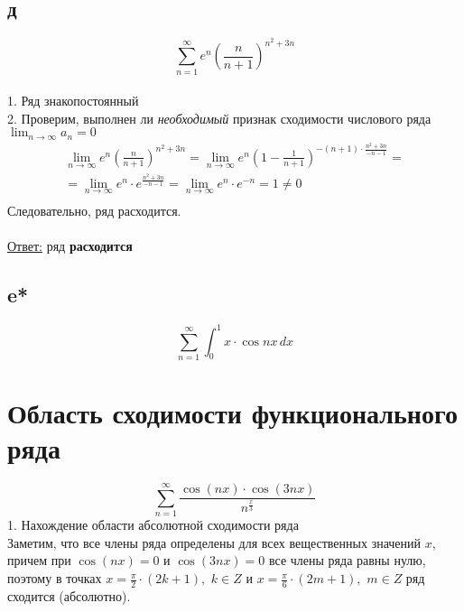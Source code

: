 \documentclass[a5paper, 10pt]{article}
\theoremstyle{definition}
\theoremstyle{plain}
\theoremstyle{remark}
\begin{document}
\subsection{д}
\begin{equation}
\sum \limits_{n = 1}^{\infty} e^n \left( \frac{n}{n+1} \right)^{n^2+3n}
\end{equation}
\\
1. Ряд знакопостоянный\\
2. Проверим, выполнен ли \textit{необходимый} признак сходимости числового ряда $ \lim_{n \to \infty} a_n = 0$
\begin{multline*}
\lim_{n \to \infty} e^n \left( \frac{n}{n+1} \right)^{n^2+3n} =
 \lim_{n \to \infty} e^n \left( 1-\frac{1}{n+1} \right)^{-(n+1) \cdot \frac{n^2+3n}{-n-1}} = \\ =
\lim_{n \to \infty} e^n\cdot e^{ \frac{n^2+3n}{-n-1}}  = \lim_{n \to \infty} e^n\cdot e^{-n} = 1 \neq 0 \\
\end{multline*}
Следовательно, ряд расходится.\\\\
\underline{Ответ:} ряд  \textbf{расходится}
\newpage
\subsection{e*}
\begin{equation}
\sum \limits_{n = 1}^{\infty}\int_0^1 x \cdot \cos nx \, dx
\end{equation}


\newpage
\section{Область сходимости функционального ряда}
\begin{equation}
\sum \limits_{n = 1}^{\infty}\frac{\cos( nx) \cdot \cos (3nx) }{n^{\frac{x}{3}}}
\end{equation}
1. Нахождение области абсолютной сходимости ряда\\

Заметим, что все члены ряда определены для всех вещественных значений $x$, причем при $\cos(nx) = 0$  и $\cos(3 nx) = 0$  все члены ряда равны нулю, поэтому \hypertarget{pdf}{в точках}  $x = \frac{\pi}{2} \cdot (2k + 1), \,\, k \in Z$  и $x = \frac{\pi}{6} \cdot (2m + 1), \,\, m \in Z$ ряд сходится (абсолютно).\\
\end{document}
